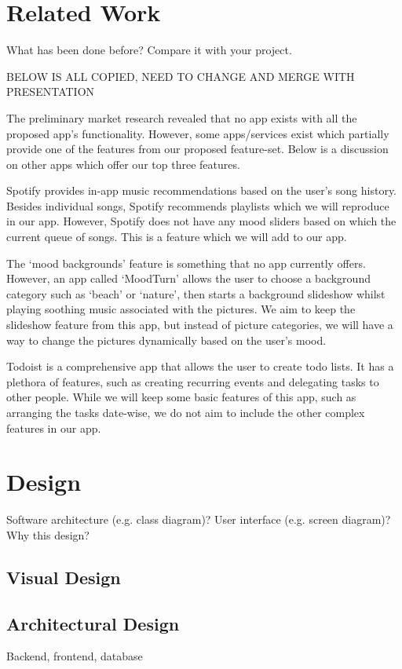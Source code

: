 \documentclass[conference]{IEEEtran}
\begin{document}
\section{Related Work}
What has been done before? Compare it with your project.

BELOW IS ALL COPIED, NEED TO CHANGE AND MERGE WITH PRESENTATION

The preliminary market research revealed that no app exists with all the proposed app’s functionality. However, some apps/services exist which partially provide one of the features from our proposed feature-set. Below is a discussion on other apps which offer our top three features.

Spotify provides in-app music recommendations based on the user’s song history. Besides individual songs, Spotify recommends playlists which we will reproduce in our app. However, Spotify does not have any mood sliders based on which the current queue of songs. This is a feature which we will add to our app. 

The ‘mood backgrounds’ feature is something that no app currently offers. However, an app called ‘MoodTurn’ allows the user to choose a background category such as ‘beach’ or ‘nature’, then starts a background slideshow whilst playing soothing music associated with the pictures. We aim to keep the slideshow feature from this app, but instead of picture categories, we will have a way to change the pictures dynamically based on the user’s mood. 

Todoist is a comprehensive app that allows the user to create todo lists. It has a plethora of features, such as creating recurring events and delegating tasks to other people. While we will keep some basic features of this app, such as arranging the tasks date-wise, we do not aim to include the other complex features in our app.


\section{Design}
Software architecture (e.g. class diagram)? User interface (e.g. screen diagram)? Why this design?

\subsection{Visual Design}

\subsection{Architectural Design}
Backend, frontend, database
\end{document}
